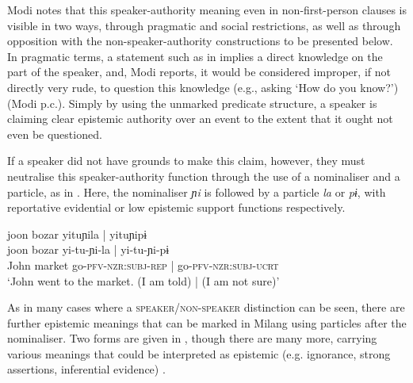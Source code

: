 Modi notes that this speaker-authority meaning even in non-first-person clauses is visible in two ways, through pragmatic and social restrictions, as well as through opposition with the non-speaker-authority constructions to be presented below. In pragmatic terms, a statement such as in  implies a direct knowledge on the part of the speaker, and, Modi reports, it would be considered improper, if not directly very rude, to question this knowledge (e.g., asking `How do you know?') (Modi p.c.). Simply by using the unmarked predicate structure, a speaker is claiming clear epistemic authority over an event to the extent that it ought not even be questioned.

If a speaker did not have grounds to make this claim, however, they must neutralise this speaker-authority function through the use of a nominaliser and a particle, as in . Here, the nominaliser \textit{ɲi} is followed by a particle \textit{la} or \textit{pɨ}, with reportative evidential or low epistemic support functions respectively.

\begin{exe}
        \ex \label{e:Description:MilangNonEgo}
        \glll joon bozar yituɲila | yituɲipɨ \\
        joon bozar yi-tu-ɲi-la | yi-tu-ɲi-pɨ \\
        John market go-\textsc{pfv}-\textsc{nzr:subj}-\textsc{rep} | go-\textsc{pfv}-\textsc{nzr:subj}-\textsc{ucrt} \\
        \glt `John went to the market. (I am told) | (I am not sure)' \\
        \cite[Milang,][457, given as two examples in source and combined here]{Modi2017}
\end{exe}
As in many cases where a \textsc{speaker}/\textsc{non-speaker} distinction can be seen, there are further epistemic meanings that can be marked in Milang using particles after the nominaliser. Two forms are given in , though there are many more, carrying various meanings that could be interpreted as epistemic (e.g. ignorance, strong assertions, inferential evidence) \cite[273]{Modi2017}.

